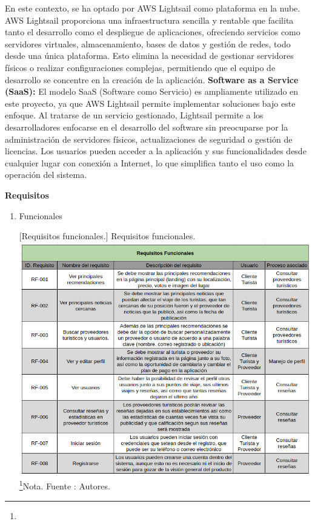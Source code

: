 \begin{itemize}
En este contexto, se ha optado por AWS Lightsail como plataforma en la nube. AWS Lightsail proporciona una infraestructura sencilla y rentable que facilita tanto el desarrollo como el despliegue de aplicaciones, ofreciendo servicios como servidores virtuales, almacenamiento, bases de datos y gestión de redes, todo desde una única plataforma. Esto elimina la necesidad de gestionar servidores físicos o realizar configuraciones complejas, permitiendo que el equipo de desarrollo se concentre en la creación de la aplicación. 
\newline
\textbf{Software as a Service (SaaS):}
El modelo SaaS (Software como Servicio) es ampliamente utilizado en este proyecto, ya que AWS Lightsail permite implementar soluciones bajo este enfoque. Al tratarse de un servicio gestionado, Lightsail permite a los desarrolladores enfocarse en el desarrollo del software sin preocuparse por la administración de servidores físicos, actualizaciones de seguridad o gestión de licencias. Los usuarios pueden acceder a la aplicación y sus funcionalidades desde cualquier lugar con conexión a Internet, lo que simplifica tanto el uso como la operación del sistema. 

\textbf{Requisitos}

\begin{enumerate}
    \item Funcionales
        \par\vspace{2mm}
        \begin{minipage}{0.9\textwidth}
        \centering
        [{Requisitos funcionales.}]{ Requisitos funcionales.}
        \label{req1}
        \includegraphics[width=1\textwidth]{Content/Images/requisitos.png}
        \footnote{}{Nota. \textup{Fuente : Autores.}}
        \end{minipage}
           

\end{enumerate}
\end{itemize}

